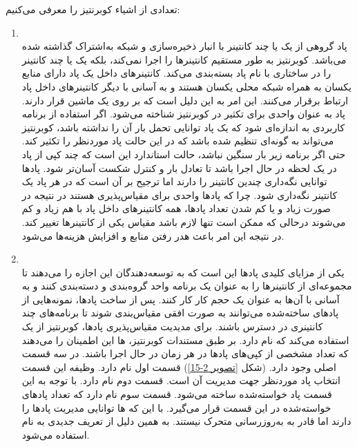\newpage

تعدادی از اشیاء کوبرنتیز را معرفی می‌کنیم:
\cite{sanche_2018}
\begin{enumerate}
	\item
	\\
	پاد گروهی از یک یا چند کانتینر با انبار ذخیره‌سازی  و شبکه به‌اشتراک‌ گذاشته‌ شده می‌باشد. کوبرنتیز به طور مستقیم کانتینرها را اجرا نمی‌کند، بلکه یک یا چند کانتینر را  در ساختاری با نام پاد بسته‌بندی می‌کند. کانتینرهای داخل یک پاد دارای منابع یکسان به همراه شبکه محلی یکسان هستند و به آسانی با دیگر کانتینرهای داخل پاد ارتباط برقرار می‌کنند. این امر به این دلیل است که بر روی یک ماشین قرار دارند. پاد به عنوان واحدی برای تکثیر در کوبرنتیز شناخته می‌شود. اگر استفاده از برنامه کاربردی به اندازه‌ای شود که یک پاد توانایی تحمل بار آن را نداشته باشد، کوبرنتیز می‌تواند به گونه‌ای تنظیم شده باشد که در این حالت پاد موردنظر را تکثیر کند. حتی اگر برنامه‌ زیر بار سنگین نباشد، حالت استاندارد این است که چند کپی از پاد در یک لحظه در حال اجرا باشد تا تعادل بار و کنترل شکست آسان‌تر شود.
	پادها توانایی نگه‌داری چندین کانتینر را دارند اما ترجیح بر آن است که در هر پاد یک کانتینر نگه‌داری شود. چرا که پادها واحدی برای مقیاس‌پذیری هستند در نتیجه در صورت زیاد و یا کم‌ شدن تعداد پادها، همه کانتینرهای داخل پاد با هم زیاد و کم می‌شوند در‌حالی که ممکن است تنها لازم باشد مقیاس یکی از کانتینرها تغییر کند. در نتیجه این امر باعث هدر رفتن منابع و افزایش هزینه‌ها می‌شود. 
	
	\item
	\\
	یکی از مزایای کلیدی پادها این است که به توسعه‌دهندگان این اجازه را می‌دهند تا مجموعه‌ای از کانتینرها را به عنوان یک برنامه واحد گروه‌بندی و دسته‌بندی کنند و به آسانی با آن‌ها به عنوان یک حجم کار  کار کنند. پس از ساخت پادها، نمونه‌هایی از پادهای ساخته‌شده می‌توانند به صورت افقی مقیاس‌بندی شوند تا برنامه‌های چند کانتینری در دسترس باشند. برای مدیدیت مقیاس‌پذیری پادها، کوبرنتیز از یک  استفاده می‌کند که  نام دارد.
	بر طبق مستندات کوبرنتیز،  ها این اطمینان را می‌دهند که تعداد مشخصی از کپی‌های پادها در هر زمان در حال اجرا باشند. 
	در 		سه قسمت اصلی وجود دارد. (شکل \ref{تصویر 2-15}) قسمت اول  نام دارد. وظیفه این قسمت انتخاب پاد موردنظر جهت مدیریت آن است. قسمت دوم 	نام دارد.		با توجه به این قسمت پاد خواسته‌شده ساخته می‌شود. قسمت سوم		نام دارد که تعداد پادهای خواسته‌شده در این قسمت قرار می‌گیرد. با این که		ها توانایی مدیریت پادها را دارند اما قادر به به‌روز‌رسانی متحرک نیستند. به همین دلیل از تعریف جدیدی به نام  استفاده می‌شود. 
	\cite{nirmata_ReplicaSetsAndDeployments}
	

\end{enumerate}
